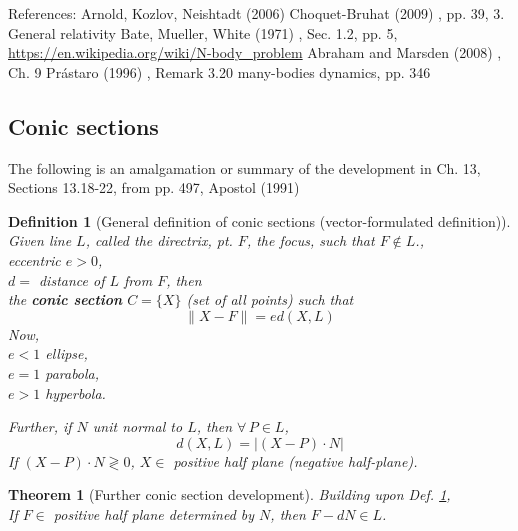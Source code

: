 \documentclass[10pt]{amsart}
\newtheorem{theorem}{Theorem}
\newtheorem{definition}{Definition}
\begin{document}
\begin{multicols*}{2}
References:
Arnold, Kozlov, Neishtadt (2006) \cite{AKN2006}
Choquet-Bruhat (2009) \cite{YChoquet-Bruhat2009}, pp. 39, 3. General relativity
Bate, Mueller, White (1971) \cite{BMW1971}, Sec. 1.2, pp. 5, \url{https://en.wikipedia.org/wiki/N-body_problem}
Abraham and Marsden (2008) \cite{AbMa2008}, Ch. 9
Pr\'{a}staro (1996) \cite{Pras1996}, Remark 3.20 many-bodies dynamics, pp. 346


\subsection{Conic sections}

The following is an amalgamation or summary of the development in Ch. 13, Sections 13.18-22, from pp. 497, Apostol (1991) \cite{Apos1991}

\begin{definition}[General definition of conic sections (vector-formulated definition)]\label{Def:ConicSectionsVectorFormulation}
Given line $L$, called the \emph{directrix}, pt. $F$, the \emph{focus}, such that $F \notin L$., \\
\phantom{Given} eccentric $e > 0$, \\
\phantom{Given} $d = $ distance of $L$ from $F$, then \\
the \textbf{conic section} $C = \lbrace X \rbrace$ (set of all points) such that 
\begin{equation}\label{Eq:ConicSectionVectorGeneralDefinition}
\| X - F \| = ed(X, L)
\end{equation}
Now, \\
$e < 1 $ ellipse, \\
$e = 1$ parabola, \\
$e > 1$ hyperbola.

Further, if $N$ unit normal to $L$, then $\forall \, P \in L$, 
\begin{equation}
d(X, L) = | (X- P) \cdot N |
\end{equation}
If $(X- P) \cdot N \gtrless 0$, $X \in $ positive half plane (negative half-plane). \\
\end{definition} 

\begin{theorem}[Further conic section development]\label{Thm:MoreConicSectionsFromVectorFormulation}
	Building upon Def. \ref{Def:ConicSectionsVectorFormulation}, \\
	
	If $F \in $ positive half plane determined by $N$, then $F -d N \in L$.  \\
	

\end{theorem}
\end{multicols*}
\end{document}
